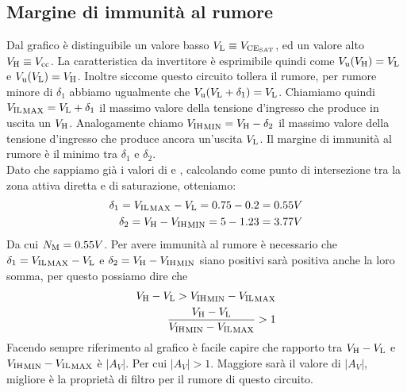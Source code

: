 \documentclass[../template]{subfiles}
\begin{document}
\subsection{Margine di immunità al rumore}
\begin{figure}[h]
    \centering
\end{figure}
\noindent
Dal grafico è distinguibile un valore basso $V_{\text{L}} \equiv V_{\text{CE}_{\text{SAT}}}$, ed un valore alto $V_{\text{H}} \equiv V_{\text{cc}}$.
La caratteristica da invertitore è esprimibile quindi come $V_{\text{u}}(V_{\text{H}}) = V_{\text{L}}$ e $V_{\text{u}}(V_{\text{L}}) = V_{\text{H}}$.
Inoltre siccome questo circuito tollera il rumore, per rumore minore di $\delta_1$ abbiamo ugualmente che $V_{\text{u}}(V_{\text{L}} + \delta_1) = V_{\text{L}}$.
Chiamiamo quindi ${V_{\text{IL}}}_\text{MAX} = V_{\text{L}} + \delta_1$ il massimo valore della tensione d'ingresso che produce in uscita un $V_{\text{H}}$.
Analogamente chiamo ${V_{\text{IH}}}_\text{MIN} = V_{\text{H}} - \delta_2$ il massimo valore della tensione d'ingresso che produce ancora un'uscita $V_{\text{L}}$.
Il margine di immunità al rumore \nm è il minimo tra $\delta_1$ e $\delta_2$.
\\
Dato che sappiamo già i valori di  e , calcolando \vihmin come punto di intersezione tra la zona attiva diretta e di saturazione,
otteniamo:
\begin{align*}
    \delta_1 = {V_{\text{IL}}}_\text{MAX} - V_{\text{L}} = 0.75 - 0.2 = 0.55 V\\
    \delta_2 = V_{\text{H}} - {V_{\text{IH}}}_\text{MIN} = 5 - 1.23 = 3.77V
\end{align*}
Da cui ${N}_\text{M} = 0.55 V$. Per avere immunità al rumore è necessario che $\delta_1 = {V_{\text{IL}}}_\text{MAX} - V_{\text{L}}$ e $\delta_2 = V_{\text{H}} - {V_{\text{IH}}}_\text{MIN}$ siano positivi
sarà positiva anche la loro somma, per questo possiamo dire che
\begin{align*}
    V_{\text{H}} - V_{\text{L}} > {V_{\text{IH}}}_\text{MIN} - {V_{\text{IL}}}_\text{MAX}\\
    \frac{V_{\text{H}} - V_{\text{L}}}{ {V_{\text{IH}}}_\text{MIN} - {V_{\text{IL}}}_\text{MAX}} > 1
\end{align*}
Facendo sempre riferimento al grafico è facile capire che rapporto tra $V_{\text{H}} - V_{\text{L}}$ e ${V_{\text{IH}}}_\text{MIN} - {V_{\text{IL}}}_\text{MAX}$ è $|A_V|$.
Per cui $|A_V| > 1$. Maggiore sarà il valore di $|A_V|$, migliore è la proprietà di filtro per il rumore di questo
circuito.
\end{document}

